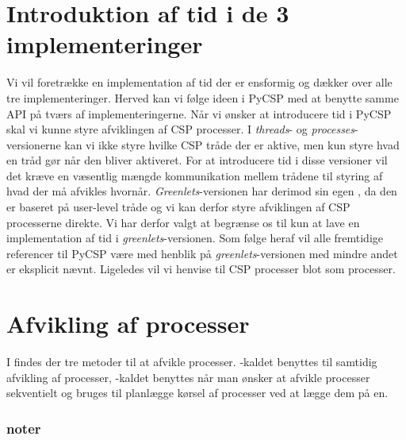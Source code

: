 \section{Introduktion af tid i de 3 implementeringer}
Vi vil foretrække en implementation af tid der er ensformig og dækker over alle tre implementeringer. Herved kan vi følge ideen i PyCSP med at benytte samme API på tværs af implementeringerne. Når vi ønsker at introducere tid i PyCSP skal vi kunne styre afviklingen af CSP processer. I  \emph{threads}- og \emph{processes}-versionerne kan vi ikke styre hvilke CSP tråde der er aktive, men kun styre hvad en tråd gør når den bliver aktiveret. For at introducere tid i disse versioner vil det kræve en væsentlig mængde kommunikation mellem trådene til styring af hvad der må afvikles hvornår. \emph{Greenlets}-versionen har derimod sin egen \sched , da den er baseret på user-level tråde og vi kan derfor styre afviklingen af CSP processerne direkte. Vi har derfor valgt at begrænse os til kun at lave en implementation af tid i \emph{greenlets}-versionen. Som følge heraf vil alle fremtidige referencer til PyCSP være med henblik på \emph{greenlets}-versionen med mindre andet er eksplicit nævnt. Ligeledes vil vi henvise til CSP processer blot som processer. 

\section{Afvikling af processer}
I \pycsp findes der tre metoder til at afvikle processer. -kaldet benyttes til samtidig afvikling af processer, -kaldet benyttes når man ønsker at afvikle processer sekventielt og  bruges til planlægge kørsel af processer ved at lægge dem på \sched en. 


\subsubsection{noter}


